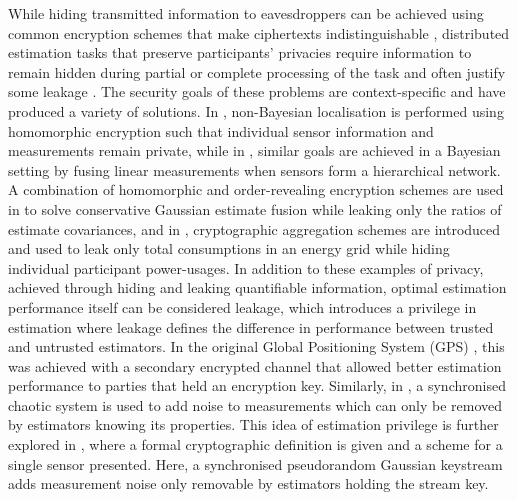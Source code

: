 \documentclass[conference]{IEEEtran}
\begin{document}
While hiding transmitted information to eavesdroppers can be achieved using common encryption schemes that make ciphertexts indistinguishable \cite{katzIntroductionModernCryptography2008}, distributed estimation tasks that preserve participants' privacies require information to remain hidden during partial or complete processing of the task and often justify some leakage \cite{risticSecureFastCovariance2021,shiPrivacyPreservingAggregationTimeSeries2011}. The security goals of these problems are context-specific and have produced a variety of solutions. In \cite{alanwarPrOLocResilientLocalization2017}, non-Bayesian localisation is performed using homomorphic encryption such that individual sensor information and measurements remain private, while in \cite{aristovEncryptedMultisensorInformation2018}, similar goals are achieved in a Bayesian setting by fusing linear measurements when sensors form a hierarchical network. A combination of homomorphic and order-revealing encryption schemes are used in \cite{risticSecureFastCovariance2021} to solve conservative Gaussian estimate fusion while leaking only the ratios of estimate covariances, and in \cite{shiPrivacyPreservingAggregationTimeSeries2011,joyeScalableSchemePrivacyPreserving2013}, cryptographic aggregation schemes are introduced and used to leak only total consumptions in an energy grid while hiding individual participant power-usages. In addition to these examples of privacy, achieved through hiding and leaking quantifiable information, optimal estimation performance itself can be considered leakage, which introduces a privilege in estimation where leakage defines the difference in performance between trusted and untrusted estimators. In the original Global Positioning System (GPS) \cite{grovesPrinciplesGNSSInertial2015}, this was achieved with a secondary encrypted channel that allowed better estimation performance to parties that held an encryption key. Similarly, in \cite{murguiaInformationTheoreticPrivacyChaos2020}, a synchronised chaotic system is used to add noise to measurements which can only be removed by estimators knowing its properties. This idea of estimation privilege is further explored in \cite{risticCryptographicallyPrivilegedState2022}, where a formal cryptographic definition is given and a scheme for a single sensor presented. Here, a synchronised pseudorandom Gaussian keystream adds measurement noise only removable by estimators holding the stream key.
\end{document}
